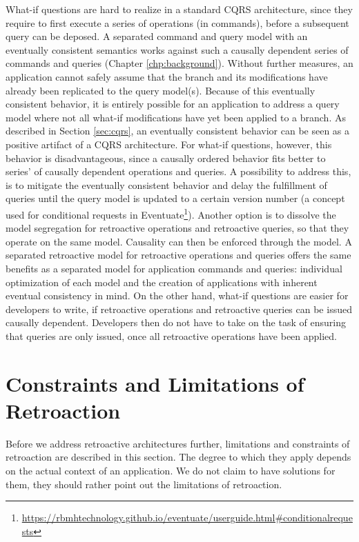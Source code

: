 What-if questions are hard to realize in a standard CQRS architecture, since 
they require to first execute a series of operations (in commands), before a 
subsequent query can be deposed. 
A separated command and query model with an eventually consistent semantics 
works against such a causally dependent series of commands and queries 
(Chapter \ref{chp:background}).
Without further measures, an application cannot safely assume that the branch 
and its modifications have already been replicated to the query model(s). 
Because of this eventually consistent behavior, it is entirely possible for an 
application to address a query model where not all what-if modifications have 
yet been applied to a branch.
As described in Section \ref{sec:cqrs}, an eventually consistent behavior can 
be seen as a positive artifact of a CQRS architecture.
%
For what-if questions, however, this behavior is disadvantageous, since a 
causally ordered behavior fits better to series' of causally dependent 
operations and queries.
A possibility to address this, is to mitigate the eventually consistent
behavior and delay the fulfillment of queries until the query model is 
updated to a certain version number (a concept used for conditional requests 
in Eventuate\footnote[1]{\href{https://rbmhtechnology.github.io/eventuate/user\-guide.html\#conditional\-requests}{https://rbmhtechnology.github.io/eventuate/user\-guide.html\#conditional\-requests}}).
Another option is to dissolve the model segregation for retroactive operations
and retroactive queries, so that they operate on the same model. 
Causality can then be enforced through the model.
%
A separated retroactive model for retroactive operations and queries offers 
the same benefits as a separated model for application commands and queries: 
individual optimization of each model and the creation of applications with 
inherent eventual consistency in mind.
On the other hand, what-if questions are easier for developers to write, 
if retroactive operations and retroactive queries can be issued causally 
dependent. Developers then do not have to take on the task of ensuring that
queries are only issued, once all retroactive operations have been applied.

\section{Constraints and Limitations of Re\-tro\-action}
\label{sec:cons}
Before we address retroactive architectures further, limitations and constraints 
of retroaction are described in this section. 
The degree to which they apply depends on the actual context of an application.
We do not claim to have solutions for them, they should rather point out the 
limitations of retroaction.

